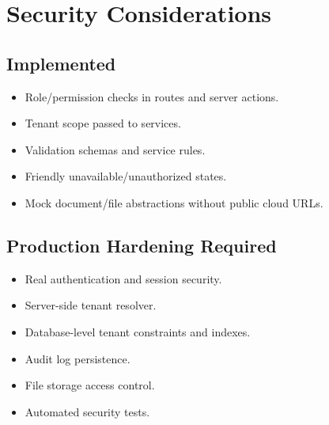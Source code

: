 \chapter{Security Considerations}
\section{Implemented}
\begin{itemize}
\item Role/permission checks in routes and server actions.
\item Tenant scope passed to services.
\item Validation schemas and service rules.
\item Friendly unavailable/unauthorized states.
\item Mock document/file abstractions without public cloud URLs.
\end{itemize}

\section{Production Hardening Required}
\begin{itemize}
\item Real authentication and session security.
\item Server-side tenant resolver.
\item Database-level tenant constraints and indexes.
\item Audit log persistence.
\item File storage access control.
\item Automated security tests.
\end{itemize}
